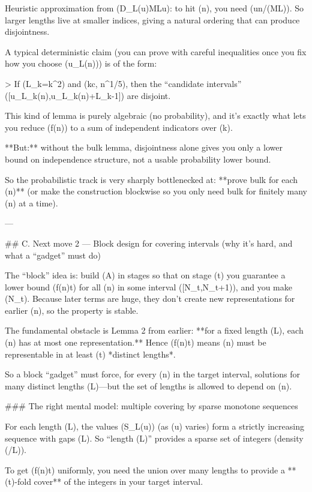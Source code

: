 Heuristic approximation from (D_L(u)\approx MLu): to hit (n), you need (u\approx n/(ML)). So larger lengths live at smaller indices, giving a natural ordering that can produce disjointness.

A typical deterministic claim (you can prove with careful inequalities once you fix how you choose (u_L(n))) is of the form:

> If (L_k=k^2) and (k\le c, n^{1/5}), then the “candidate intervals” ([u_{L_k}(n),u_{L_k}(n)+L_k-1]) are disjoint.

This kind of lemma is purely algebraic (no probability), and it’s exactly what lets you reduce (f(n)) to a sum of independent indicators over (k).

**But:** without the bulk lemma, disjointness alone gives you only a lower bound on independence structure, not a usable probability lower bound.

So the probabilistic track is very sharply bottlenecked at: **prove bulk for each (n)** (or make the construction blockwise so you only need bulk for finitely many (n) at a time).

---

## C. Next move 2 — Block design for covering intervals (why it’s hard, and what a “gadget” must do)

The “block” idea is: build (A) in stages so that on stage (t) you guarantee a lower bound (f(n)\ge t) for all (n) in some interval ([N_t,N_{t+1})), and you make (N_t\to\infty). Because later terms are huge, they don’t create new representations for earlier (n), so the property is stable.

The fundamental obstacle is Lemma 2 from earlier: **for a fixed length (L), each (n) has at most one representation.** Hence (f(n)\ge t) means (n) must be representable in at least (t) *distinct lengths*.

So a block “gadget” must force, for every (n) in the target interval, solutions for many distinct lengths (L)—but the set of lengths is allowed to depend on (n).

### The right mental model: multiple covering by sparse monotone sequences

For each length (L), the values (S_L(u)) (as (u) varies) form a strictly increasing sequence with gaps (\ge L). So “length (L)” provides a sparse set of integers (density (/L)).

To get (f(n)\ge t) uniformly, you need the union over many lengths to provide a **(t)-fold cover** of the integers in your target interval.

